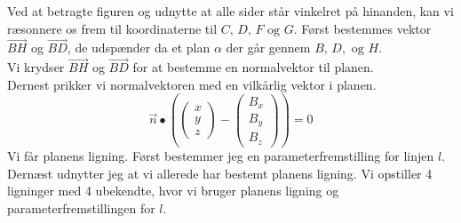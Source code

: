 \begin{tcolorbox}[title=Opgave 1,
    colback=blue!1!white,
    colframe=black,
    colbacktitle=blue!25!white,
    coltitle=red!25!black,
    fonttitle=\bfseries,
    subtitle style={boxrule=0.4pt,
    colback=blue!7!white} ]
        Ved at betragte figuren og udnytte at alle sider står vinkelret på hinanden, kan vi ræsonnere os frem til koordinaterne til \(C,\, D,\, F \text{ og } G\).
        Først bestemmes vektor \(\overrightarrow{BH}\) og \(\overrightarrow{BD}\), de udspænder da et plan \(\alpha\) der går gennem \(B,\, D,\text{ og } H\).\\
        Vi krydser \(\overrightarrow{BH}\) og \(\overrightarrow{BD}\) for at bestemme en normalvektor til planen.\\
        Dernest prikker vi normalvektoren med en vilkårlig vektor i planen.
        \[\overrightarrow{n}\bullet \left(\begin{pmatrix} x \\ y \\ z \end{pmatrix}-\begin{pmatrix}B_x \\B_y\\B_z \end{pmatrix}\right)=0\]
        Vi får planens ligning.
    Først bestemmer jeg en parameterfremstilling for linjen \(l\).\\
    Dernæst udnytter jeg at vi allerede har bestemt planens ligning. Vi opstiller 4 ligninger med 4 ubekendte, hvor vi bruger planens ligning og parameterfremstillingen for \(l\).
\end{tcolorbox}